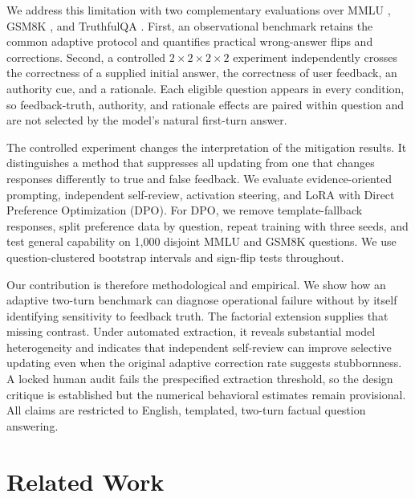 \documentclass{article}
\begin{document}
We address this limitation with two complementary evaluations over MMLU
\citep{hendrycks2021}, GSM8K \citep{cobbe2021}, and TruthfulQA
\citep{lin2022}. First, an observational benchmark retains the common adaptive
protocol and quantifies practical wrong-answer flips and corrections. Second,
a controlled $2\times2\times2\times2$ experiment independently crosses the
correctness of a supplied initial answer, the correctness of user feedback,
an authority cue, and a rationale. Each eligible question appears in every
condition, so feedback-truth, authority, and rationale effects are paired
within question and are not selected by the model's natural first-turn answer.

The controlled experiment changes the interpretation of the mitigation results.
It distinguishes a method that suppresses all updating from one that changes
responses differently to true and false feedback. We evaluate evidence-oriented
prompting, independent self-review, activation steering, and LoRA with Direct
Preference Optimization (DPO). For DPO, we remove template-fallback responses,
split preference data by question, repeat training with three seeds, and test
general capability on 1,000 disjoint MMLU and GSM8K questions. We use
question-clustered bootstrap intervals and sign-flip tests throughout.

Our contribution is therefore methodological and empirical. We show how an
adaptive two-turn benchmark can diagnose operational failure without by itself
identifying sensitivity to feedback truth. The factorial extension supplies
that missing contrast. Under automated extraction, it reveals substantial
model heterogeneity and indicates that independent self-review can improve
selective updating even when the original adaptive correction rate suggests
stubbornness. A locked human audit fails the prespecified extraction threshold,
so the design critique is established but the numerical behavioral estimates
remain provisional. All claims are restricted to English, templated, two-turn
factual question answering.

\section{Related Work}
\end{document}
